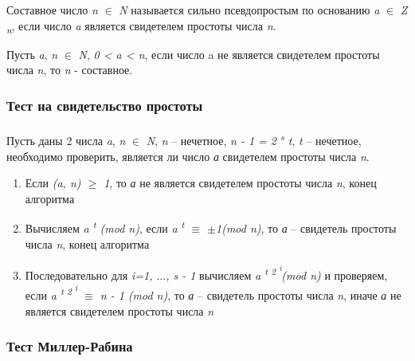   \begin{definition}    
  
      Составное число \textit{n} {$\in$} \textit{N} называется сильно псевдопростым по основанию \textit{a} 
    {$\in$} \textit{Z\textsubscript{ n}}, если число \textit{a} является свидетелем простоты числа \textit{n}.
    
  \end{definition}

  \begin{statement}   
  
      Пусть \textit{a}, \textit{n} {$\in$} \textit{N}, \textit{0 < a < n}, если число a не является свидетелем 
    простоты числа \textit{n}, то \textit{n} - составное.
    
  \end{statement}

\subsubsection{Тест на свидетельство простоты}

\paragraph{} Пусть даны 2 числа \textit{a}, \textit{n} {$\in$} \textit{N}, \textit{n} – нечетное, \textit{n - 1 = 2\textsuperscript{ s} t}, 
\textit{t} – нечетное, необходимо проверить, является ли число \textit{а} свидетелем простоты числа \textit{n}.

  \begin{enumerate}
   \item Если \textit{(a, n) {$\ge$} 1}, то \textit{а} не является свидетелем простоты числа \textit{n}, конец алгоритма
   \item Вычисляем \textit{a\textsuperscript{ t} (mod n)}, если \textit{a\textsuperscript{ t} {$\equiv$} {$\pm$}1(mod n)}, то \textit{а}
– свидетель простоты числа \textit{n}, конец алгоритма
   \item Последовательно для \textit{i=1, {$\dots$}, s - 1} вычисляем \textit{a\textsuperscript{ t 2\textsuperscript{ i}}(mod n)} и 
проверяем, если \textit{a\textsuperscript{ t 2\textsuperscript{ i}} {$\equiv$} n - 1 (mod n)}, то \textit{а} – 
свидетель простоты числа \textit{n}, иначе \textit{а} не является свидетелем простоты числа \textit{n}
  \end{enumerate}


\subsubsection{Тест Миллер-Рабина}


